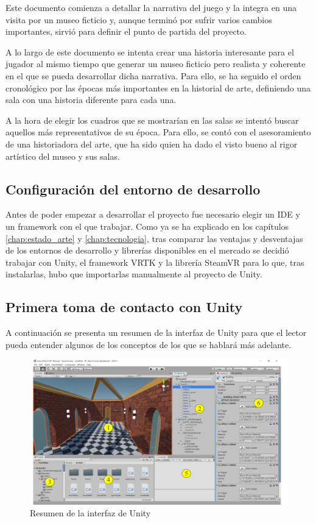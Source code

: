 Este documento comienza a detallar la narrativa del juego y la integra en una visita por un museo ficticio y, aunque terminó por sufrir varios cambios importantes, sirvió para definir el punto de partida del proyecto.

A lo largo de este documento se intenta crear una historia interesante para el jugador al mismo tiempo que generar un museo ficticio pero realista y coherente en el que se pueda desarrollar dicha narrativa. Para ello, se ha seguido el orden cronológico por las épocas más importantes en la historial de arte, definiendo una sala con una historia diferente para cada una.

A la hora de elegir los cuadros que se mostrarían en las salas se intentó buscar aquellos más representativos de su época. Para ello, se contó con el asesoramiento de una historiadora del arte, que ha sido quien ha dado el visto bueno al rigor artístico del museo y sus salas.

\subsection{Configuración del entorno de desarrollo}

Antes de poder empezar a desarrollar el proyecto fue necesario elegir un \acs{IDE} y un framework con el que trabajar. Como ya se ha explicado en los capítulos \ref{chap:estado_arte} y \ref{chap:tecnologia}, tras comparar las ventajas y desventajas de los entornos de desarrollo y librerías disponibles en el mercado se decidió trabajar con Unity, el framework \acs{VRTK} y la librería SteamVR para lo que, tras instalarlas, hubo que importarlas manualmente al proyecto de Unity.

\subsection{Primera toma de contacto con Unity}

A continuación se presenta un resumen de la interfaz de Unity para que el lector pueda entender algunos de los conceptos de los que se hablará más adelante.

\begin{figure}[!h]
\begin{center}
\includegraphics[width=1\textwidth]{imagenes/7/interfaz-unity.png}
\caption{Resumen de la interfaz de Unity}
\label{fig:interfaz-unity}
\end{center}
\end{figure}

